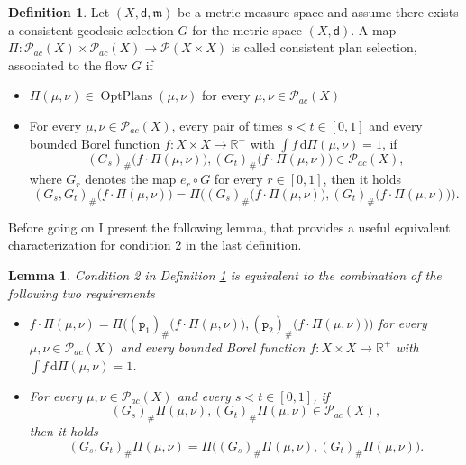 \documentclass[11pt,twoside,a4paper]{article}
\newcommand{\R}{\mathbb{R}}
\newcommand{\p}{\mathtt p} %
\newcommand{\de}{\ensuremath{\, \mathrm d}} %
\newcommand{\di}{\mathsf d} %
\newcommand{\m}{\mathfrak m} %
\DeclareMathOperator{\OptPlans}{OptPlans}
\newcommand{\Prob}{\mathscr{P}}
\theoremstyle{theorem}
\newtheorem{lemma}[theorem]{Lemma}
\theoremstyle{definition}
\newtheorem{definition}[theorem]{Definition}
\theoremstyle{remark}
\theoremstyle{proof}
\begin{document}
\begin{definition}\label{def:planselection}
Let $(X,\di,\m)$ be a metric measure space and assume there exists a consistent geodesic selection $G$ for the metric space $(X,\di)$. A map $\Pi:\Prob_{ac}(X) \times \Prob_{ac}(X) \to \Prob(X\times X)$ is called consistent plan selection, associated to the flow $G$ if 
\begin{itemize}
    \item[1)] $\Pi(\mu,\nu)\in \OptPlans(\mu,\nu)$ for every $\mu,\nu\in\Prob_{ac}(X)$
    \item[2)] For every $\mu,\nu\in \Prob_{ac}(X)$, every pair of times $s<t\in [0,1]$ and every bounded Borel function $f:X\times X\to \R^+$ with $\int f \de \Pi(\mu,\nu)=1$, if 
    \begin{equation*}
        (G_s)_\# \big(f \cdot \Pi(\mu,\nu)\big), (G_t)_\# \big(f \cdot \Pi(\mu,\nu)\big) \in \Prob_{ac}(X),
    \end{equation*}
    where $G_r$ denotes the map $e_r \circ G$ for every $r\in[0,1]$, then it holds
    \begin{equation*}
        (G_s,G_t)_\# \big(f \cdot \Pi(\mu,\nu)\big)= \Pi\big((G_s)_\# \big(f\cdot \Pi(\mu,\nu)\big), (G_t)_\# \big(f\cdot\Pi(\mu,\nu)\big)\big).
    \end{equation*}
\end{itemize}
\end{definition}

\noindent Before going on I present the following lemma, that provides a useful equivalent characterization for condition 2 in the last definition.

\begin{lemma}\label{lem:conditions}
Condition 2 in Definition \ref{def:planselection} is equivalent to the combination of the following two requirements 
\begin{itemize}
    \item[2.1)] $f \cdot \Pi(\mu,\nu) = \Pi\big( (\p_1)_\# \big(f\cdot \Pi(\mu,\nu)\big),(\p_2)_\# \big(f\cdot \Pi(\mu,\nu)\big)\big)$  for every $\mu,\nu\in \Prob_{ac}(X)$ and every bounded Borel function $f:X\times X\to \R^+$ with $\int f \de \Pi(\mu,\nu)=1$.
    \item[2.2)] For every $\mu,\nu\in \Prob_{ac}(X)$ and every $s<t\in [0,1]$, if
    \begin{equation*}
        (G_s)_\# \Pi(\mu,\nu), (G_t)_\# \Pi(\mu,\nu) \in \Prob_{ac}(X),
    \end{equation*}
    then it holds
    \begin{equation*}
        (G_s,G_t)_\# \Pi(\mu,\nu)= \Pi\big((G_s)_\# \Pi(\mu,\nu),(G_t)_\# \Pi(\mu,\nu)\big).
    \end{equation*}
\end{itemize}
\end{lemma}
\end{document}
